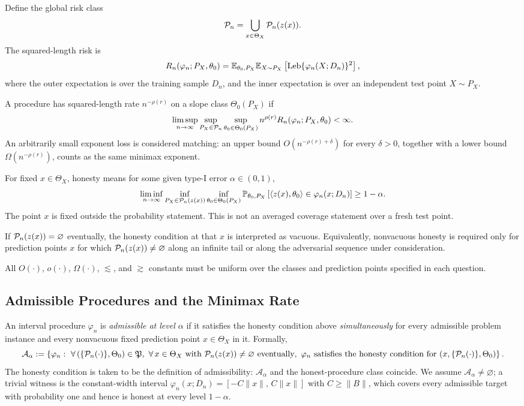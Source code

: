 \documentclass{article}
\begin{document}
Define the global risk class
\[
  \mathcal P_n=\bigcup_{x\in\Theta_X}\mathcal P_n(z(x)).
\]
The squared-length risk is
\[
  R_n(\varphi_n;P_X,\theta_0)
  =
  \mathbb{E}_{\theta_0,P_X}
  \mathbb{E}_{X\sim P_X}
  \left[
    \operatorname{Leb}\{\varphi_n(X;D_n)\}^2
  \right],
\]
where the outer expectation is over the training sample \(D_n\), and the
inner expectation is over an independent test point \(X\sim P_X\).

A procedure has squared-length rate \(n^{-\rho(r)}\) on a slope class
\(\Theta_0(P_X)\) if
\[
  \limsup_{n\to\infty}
  \sup_{P_X\in\mathcal P_n}
  \sup_{\theta_0\in\Theta_0(P_X)}
  n^{\rho(r)}R_n(\varphi_n;P_X,\theta_0)<\infty .
\]
An arbitrarily small exponent loss is considered matching: an upper bound
\(O(n^{-\rho(r)+\delta})\) for every \(\delta>0\), together with a lower bound
\(\Omega(n^{-\rho(r)})\), counts as the same minimax exponent.

For fixed \(x\in\Theta_X\), honesty means
for some given type-I error $\alpha\in(0,1)$,
\[
  \liminf_{n\to\infty}
  \inf_{P_X\in\mathcal P_n(z(x))}
  \inf_{\theta_0\in\Theta_0(P_X)}
  \mathbb{P}_{\theta_0,P_X}
  \left[
    \langle z(x),\theta_0\rangle\in\varphi_n(x;D_n)
  \right]
  \ge 1-\alpha .
\]
The point \(x\) is fixed outside the probability statement. This is not an
averaged coverage statement over a fresh test point.

If \(\mathcal P_n(z(x))=\varnothing\) eventually, the honesty condition at that
\(x\) is interpreted as vacuous. Equivalently, nonvacuous honesty is required
only for prediction points \(x\) for which \(\mathcal P_n(z(x))\neq\varnothing\)
along an infinite tail or along the adversarial sequence under consideration.

All \(O(\cdot)\), \(o(\cdot)\), \(\Omega(\cdot)\), \(\lesssim\), and
\(\gtrsim\) constants must be uniform over the classes and prediction points
specified in each question.

\subsection*{Admissible Procedures and the Minimax Rate}

An interval procedure \(\varphi_n\) is \emph{admissible at level
\(\alpha\)} if it satisfies the honesty condition above
\emph{simultaneously} for every admissible problem instance and every
nonvacuous fixed prediction point \(x\in\Theta_X\) in it. Formally,
\[
  \mathcal A_\alpha
  :=
  \left\{
    \varphi_n :\
    \forall\,(\{\mathcal P_n(\cdot)\},\Theta_0)\in\mathfrak P,\
    \forall\,x\in\Theta_X\text{ with }\mathcal P_n(z(x))\neq\varnothing
    \text{ eventually},\
    \varphi_n\text{ satisfies the honesty condition for }(x,\{\mathcal P_n(\cdot)\},\Theta_0)
  \right\}.
\]
The honesty condition is taken to be the definition of admissibility:
\(\mathcal A_\alpha\) and the honest-procedure class coincide. We
assume \(\mathcal A_\alpha\neq\varnothing\); a trivial witness is the
constant-width interval \(\varphi_n(x;D_n)=[-C\|x\|,\,C\|x\|]\) with
\(C\geq\|B\|\), which covers every admissible target with probability
one and hence is honest at every level \(1-\alpha\).
\end{document}
